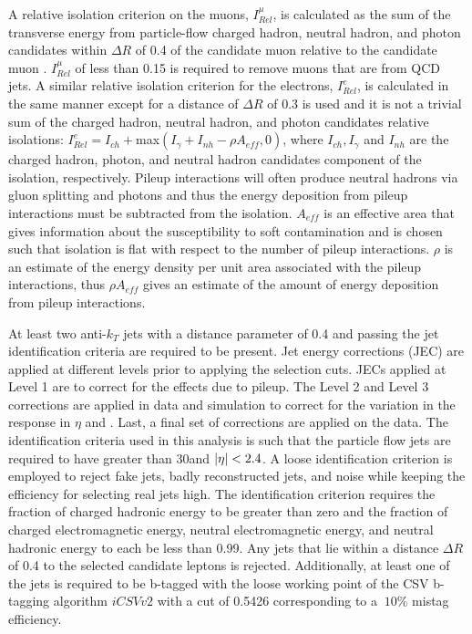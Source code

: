 A relative isolation criterion on the muons, $I_{Rel}^{\mu}$, is calculated as the sum of the transverse energy from particle-flow charged hadron, neutral hadron, and photon candidates within $\Delta R$ of 0.4 of the candidate muon relative to the candidate muon \pT. $I_{Rel}^{\mu}$ of less than 0.15 is required to remove muons that are from QCD jets. A similar relative isolation criterion for the electrons, $I_{Rel}^{e}$, is calculated in the same manner except for a distance of $\Delta R$ of 0.3 is used and it is not a trivial sum of the charged hadron, neutral hadron, and photon candidates relative isolations: $I_{Rel}^{e}=I_{ch}+$max$(I_\gamma + I_{nh} - \rho A_{eff}, 0)$, where $I_{ch}, I_\gamma$ and $I_{nh}$ are the charged hadron, photon, and neutral hadron candidates component of the isolation, respectively. Pileup interactions will often produce neutral hadrons via gluon splitting and photons and thus the energy deposition from pileup interactions must be subtracted from the isolation. $A_{eff}$ is an effective area that gives information about the susceptibility to soft contamination and is chosen such that isolation is flat with respect to the number of pileup interactions. $\rho$ is an estimate of the energy density per unit area associated with the pileup interactions, thus $\rho A_{eff}$ gives an estimate of the amount of energy deposition from pileup interactions.

At least two anti-$k_T$ jets with a distance parameter of 0.4 and passing the jet identification criteria are required to be present. Jet energy corrections (JEC) are applied at different levels prior to applying the selection cuts. JECs applied at Level 1 are to correct for the effects due to pileup. The Level 2 and Level 3 corrections are applied in data and simulation to correct for the variation in the response in $\eta$ and \pT. Last, a final set of corrections are applied on the data. The identification criteria used in this analysis is such that the particle flow jets are required to have \pT greater than 30\GeV and $\left\vert\eta\right\vert < 2.4$. A loose identification criterion is employed to reject fake jets, badly reconstructed jets, and noise while keeping the efficiency for selecting real jets high. The identification criterion requires the fraction of charged hadronic energy to be greater than zero and the fraction of charged electromagnetic energy, neutral electromagnetic energy, and neutral hadronic energy to each be less than 0.99. Any jets that lie within a distance $\Delta R$ of 0.4 to the selected candidate leptons is rejected. Additionally, at least one of the jets is required to be b-tagged with the loose working point of the CSV b-tagging algorithm $iCSVv2$ with a cut of 0.5426 corresponding to a $~10\%$ mistag efficiency.

